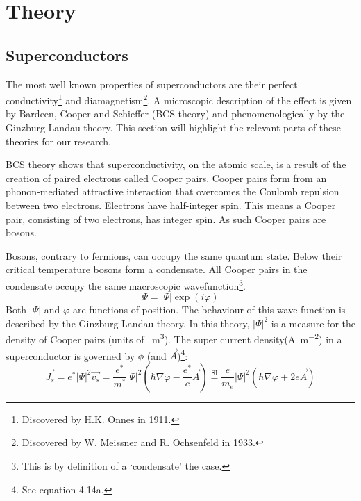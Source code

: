 \chapter{Theory}
\section{Superconductors}
The most well known properties of superconductors are their perfect conductivity\footnote{Discovered by H.K. Onnes in 1911.} and diamagnetism\footnote{Discovered by W. Meissner and R. Ochsenfeld in 1933.}. A microscopic description of the effect is given by Bardeen, Cooper and Schieffer (BCS theory) and phenomenologically by the Ginzburg-Landau theory.\cite{tinkhamIntroductionSuperconductivity} This section will highlight the relevant parts of these theories for our research.

BCS theory shows that superconductivity, on the atomic scale, is a result of the creation of paired electrons called Cooper pairs. Cooper pairs form from an phonon-mediated attractive interaction that overcomes the Coulomb repulsion between two electrons.\cite{bardeenTheorySuperconductivity1957} Electrons have half-integer spin. This means a Cooper pair, consisting of two electrons, has integer spin. As such Cooper pairs are bosons.

Bosons, contrary to fermions, can occupy the same quantum state. Below their critical temperature bosons form a condensate. All Cooper pairs in the condensate occupy the same macroscopic wavefunction\footnote{This is by definition of a `condensate' the case.}.
\begin{equation}
	\Psi = \left|\Psi\right| \exp(i\varphi)
	\label{eqn:GL-wavefunction}
\end{equation}
Both $\left|\Psi\right|$ and $\varphi$ are functions of position. The behaviour of this wave function is described by the Ginzburg-Landau theory. In this theory, $|\Psi|^2$ is a measure for the density of Cooper pairs (units of \unit{\per\cubic\meter}). The super current density(\unit{\ampere\per\square\meter}) in a superconductor is governed by $\phi$ (and $\vec{A}$)\footnote{See  equation 4.14a.}:
\begin{equation}
	\vec{J_s} = e^* |\Psi|^2 \vec{v_s} = \frac{e^*}{m^*} |\Psi|^2 \left(\hbar \nabla \varphi-\frac{e^*}{c} \vec{A}\right) \stackrel{\text{SI}}{=} \frac{e}{m_e} |\Psi|^2 \left(\hbar \nabla \varphi + 2e \vec{A}\right)
	\label{eqn:super-current}
\end{equation}

